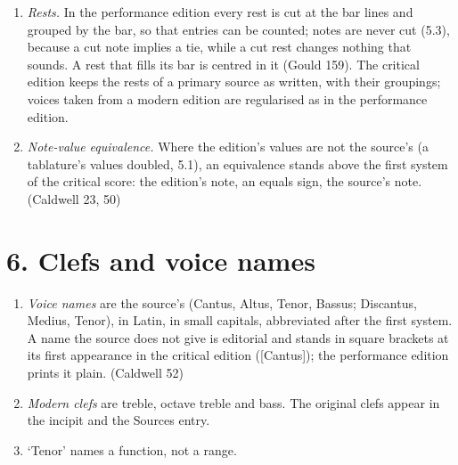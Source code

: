 \begin{enumerate}
  \begin{itemize}
  \tightlist
  \item
    Print the source's long at every final: the end of the piece, and the end of a section, a \emph{pars} or a repeated half where the source marks the break.
  \item
    Add no fermata over a long. Print a fermata (corona) only where the source has one.
  \item
    A long inside a phrase is a measured value, not a hold. Print it as such.
  \item
    A long that must end with the other voices but enters late is scaled to its real length. A maxima in one voice only may be given as a long, with a note.
  \end{itemize}
\item
  \textit{Rests.} In the performance edition every rest is cut at the bar lines and grouped by the bar, so that entries can be counted; notes are never cut (5.3), because a cut note implies a tie, while a cut rest changes nothing that sounds. A rest that fills its bar is centred in it (Gould 159). The critical edition keeps the rests of a primary source as written, with their groupings; voices taken from a modern edition are regularised as in the performance edition.
\item
  \textit{Note-value equivalence.} Where the edition's values are not the source's (a tablature's values doubled, 5.1), an equivalence stands above the first system of the critical score: the edition's note, an equals sign, the source's note. (Caldwell 23, 50)
\end{enumerate}

\section*{6. Clefs and voice names}

\begin{enumerate}

\tightlist
\item
  \textit{Voice names} are the source's (Cantus, Altus, Tenor, Bassus; Discantus, Medius, Tenor), in Latin, in small capitals, abbreviated after the first system. A name the source does not give is editorial and stands in square brackets at its first appearance in the critical edition ({[}Cantus{]}); the performance edition prints it plain. (Caldwell 52)
\item
  \textit{Modern clefs} are treble, octave treble and bass. The original clefs appear in the incipit and the Sources entry.
\item
  ‘Tenor’ names a function, not a range.
\end{enumerate}

